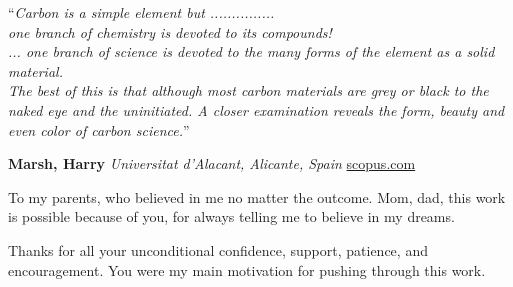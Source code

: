 \documentclass[
11pt, 
oneside,
english,
onehalfspacing,
onehalfspacing,
parskip,
headsepline,
]{MastersDoctoralThesis}
\begin{document}
\begin{center}

\noindent\enquote{\itshape Carbon is a simple element but ............... \\
\medskip 
one branch of chemistry is devoted to its compounds! \\
\medskip 
... one branch of science is devoted to the many forms of the element as a solid material. \\
\medskip 
The best of this is that although most carbon materials are grey or black to the naked eye and the uninitiated. A closer examination reveals the form, beauty and even color of carbon science.}\bigbreak
\end{center}

\begin{flushright}
\textbf{Marsh, Harry} \linebreak
\emph{Universitat d'Alacant, Alicante, Spain} \linebreak
\href{https://www.scopus.com/authid/detail.uri?authorId=7201585695}{scopus.com}
\end{flushright}

\vspace*{\fill}


\begin{dedication}
To my parents, who believed in me no matter the outcome. Mom, dad, this work is possible because of you, for always telling me to believe in my dreams.

Thanks for all your unconditional confidence, support, patience, and encouragement. You were my main motivation for pushing through this work.

\end{dedication}

\end{document}
